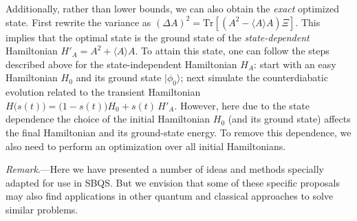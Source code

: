 \documentclass[aps,pra,twocolumn,floatfix,groupedaddress,superscriptaddress,nofootinbib,notitlepage]{revtex4-2}
\begin{document}
Additionally, rather than lower bounds, we can also obtain the \textit{exact} optimized state. First rewrite the variance as $(\Delta A)^{2} = \mathrm{Tr}[(A^{2}-\langle A \rangle A) \Xi]$. This implies that the optimal state is the ground state of the \textit{state-dependent} Hamiltonian $H'_{A}=A^{2}+\langle A\rangle A$. To attain this state, one can follow the steps described above for the state-independent Hamiltonian $H_{A}$: start with an easy Hamiltonian $H_{0}$ and its ground state $|\phi_{0}\rangle$; next simulate the counterdiabatic evolution related to the transient Hamiltonian $H\big(s(t)\big)=\big(1-s(t)\big)H_{0}+s(t) \,H'_{A}$. However, here due to the state dependence the choice of the initial Hamiltonian $H_{0}$ (and its ground state) affects the final Hamiltonian and its ground-state energy. To remove this dependence, we also need to perform an optimization over all initial Hamiltonians.

\textit{Remark}.---Here we have presented a number of ideas and methods specially adapted for use in SBQS. But we envision that some of these specific proposals may also find applications in other quantum and classical approaches to solve similar problems.
\end{document}
